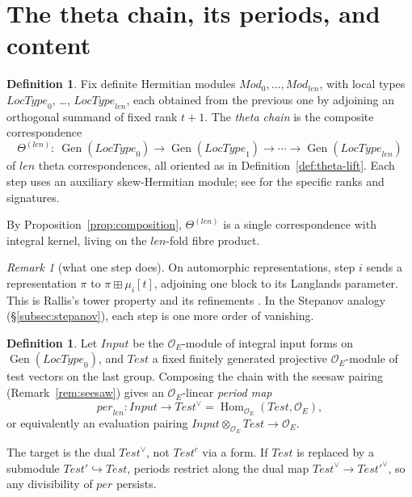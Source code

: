 \documentclass[11pt]{amsart}
\theoremstyle{definition}
\newtheorem{definition}[theorem]{Definition}
\theoremstyle{remark}
\newtheorem{remark}[theorem]{Remark}
\newcommand{\OEring}{\mathcal{O}_E}
\newcommand{\Md}{\mathit{Mod}}
\newcommand{\Input}{\mathit{Input}}
\newcommand{\Test}{\mathit{Test}}
\newcommand{\per}{\mathit{per}}
\newcommand{\len}{\mathit{len}}
\newcommand{\LocType}{\mathit{LocType}}
\DeclareMathOperator{\Hom}{Hom}
\DeclareMathOperator{\Gen}{Gen}
\newcommand{\dual}{^{\vee}}
\newcommand{\conj}{^{c}}
\begin{document}
\section{The theta chain, its periods, and content}\label{sec:chain}

\begin{definition}\label{def:chain}
Fix definite Hermitian modules $\Md_0,\dots,\Md_{\len}$, with local types $\LocType_0$, \dots, $\LocType_{\len}$, each obtained from the previous one by adjoining an orthogonal summand of fixed rank $t+1$. The \emph{theta chain} is the composite correspondence
\[
\Theta^{(\len)}:\ \Gen(\LocType_0)\to\Gen(\LocType_1)\to\cdots\to\Gen(\LocType_{\len})
\]
of $\len$ theta correspondences, all oriented as in Definition~\ref{def:theta-lift}. Each step uses an auxiliary skew-Hermitian module; see \cite{Alpoge,golf} for the specific ranks and signatures.
\end{definition}

By Proposition~\ref{prop:composition}, $\Theta^{(\len)}$ is a single correspondence with integral kernel, living on the $\len$-fold fibre product.

\begin{remark}[what one step does]
On automorphic representations, step $i$ sends a representation $\pi$ to $\pi\boxplus\mu_i[t]$, adjoining one block to its Langlands parameter. This is Rallis's tower property \cite{Rallis} and its refinements \cite{Gan-theta}. In the Stepanov analogy (\S\ref{subsec:stepanov}), each step is one more order of vanishing.
\end{remark}

\begin{definition}\label{def:period}
Let $\Input$ be the $\OEring$-module of integral input forms on $\Gen(\LocType_0)$, and $\Test$ a fixed finitely generated projective $\OEring$-module of test vectors on the last group. Composing the chain with the seesaw pairing (Remark~\ref{rem:seesaw}) gives an $\OEring$-linear \emph{period map}
\[
\per_{\len}\colon\Input\longrightarrow\Test\dual=\Hom_{\OEring}(\Test,\OEring),
\]
or equivalently an evaluation pairing $\Input\otimes_{\OEring}\Test\to\OEring$.
\end{definition}

The target is the dual $\Test\dual$, not $\Test\conj$ via a form. If $\Test$ is replaced by a submodule $\Test'\hookrightarrow\Test$, periods restrict along the dual map $\Test\dual\to\Test'^{\vee}$, so any divisibility of $\per$ persists.
\end{document}
